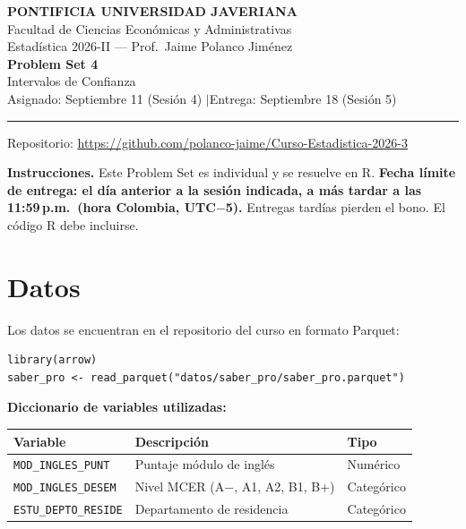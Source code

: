 \documentclass[11pt, a4paper]{article}
\begin{document}
\begin{center}
{\large\bfseries PONTIFICIA UNIVERSIDAD JAVERIANA}\\[3pt]
Facultad de Ciencias Econ\'omicas y Administrativas\\[2pt]
Estad\'istica 2026-II --- Prof.\ Jaime Polanco Jim\'enez\\[6pt]
{\LARGE\bfseries Problem Set 4}\\[3pt]
{\large Intervalos de Confianza}\\[6pt]
Asignado: Septiembre 11 (Sesi\'on 4) \quad$|$\quad Entrega: Septiembre 18 (Sesi\'on 5)
\end{center}

\vspace{6pt}
\rule{\linewidth}{0.5pt}
\vspace{2pt}
{\centering\small Repositorio: \url{https://github.com/polanco-jaime/Curso-Estadistica-2026-3}\par}
\vspace{6pt}

\textbf{Instrucciones.} Este Problem Set es individual y se resuelve en R.
\textbf{Fecha l\'imite de entrega: el d\'ia anterior a la sesi\'on indicada, a m\'as tardar a las 11:59\,p.m.\ (hora Colombia, UTC$-$5).} Entregas tard\'ias pierden el bono. El c\'odigo R debe incluirse.

\section*{Datos}

Los datos se encuentran en el repositorio del curso en formato Parquet:

\begin{lstlisting}
library(arrow)
saber_pro <- read_parquet("datos/saber_pro/saber_pro.parquet")
\end{lstlisting}

\textbf{Diccionario de variables utilizadas:}

\vspace{4pt}
\begin{tabular}{l l l}
\toprule
\textbf{Variable} & \textbf{Descripci\'on} & \textbf{Tipo} \\
\midrule
\texttt{MOD\_INGLES\_PUNT}       & Puntaje m\'odulo de ingl\'es         & Num\'erico \\
\texttt{MOD\_INGLES\_DESEM}      & Nivel MCER (A$-$, A1, A2, B1, B+)  & Categ\'orico \\
\texttt{ESTU\_DEPTO\_RESIDE}     & Departamento de residencia          & Categ\'orico \\
\bottomrule
\end{tabular}
\end{document}

